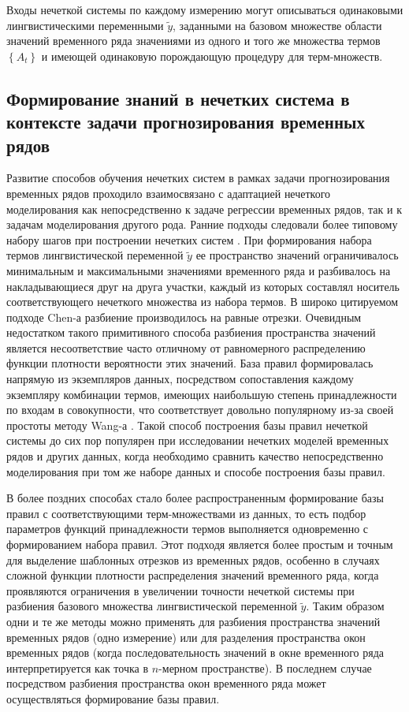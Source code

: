 Входы нечеткой системы по каждому измерению могут описываться одинаковыми лингвистическими переменными $\tilde{y}$, заданными на базовом множестве области значений временного ряда значениями из одного и того же множества термов $\left\{A_t\right\}$ и имеющей одинаковую порождающую процедуру для терм-множеств.

\subsection{Формирование знаний в нечетких система в контексте задачи прогнозирования временных рядов}

Развитие способов обучения нечетких систем в рамках задачи прогнозирования временных рядов проходило взаимосвязано с адаптацией нечеткого моделирования как непосредственно к задаче регрессии временных рядов, так и к задачам моделирования другого рода. Ранние подходы следовали более типовому набору шагов при построении нечетких систем \cite{Chellai2022}. При формирования набора термов лингвистической переменной $\tilde{y}$ ее пространство значений ограничивалось минимальным и максимальными значениями временного ряда и разбивалось на накладывающиеся друг на друга участки, каждый из которых составлял носитель соответствующего нечеткого множества из набора термов. В широко цитируемом подходе Chen-а \cite{Chen1996} разбиение производилось на равные отрезки. Очевидным недостатком такого примитивного способа разбиения пространства значений является несоответствие часто отличному от равномерного распределению функции плотности вероятности этих значений. База правил формировалась напрямую из экземпляров данных, посредством сопоставления каждому экземпляру комбинации термов, имеющих наибольшую степень принадлежности по входам в совокупности, что соответствует довольно популярному из-за своей простоты методу Wang-а \cite{Wang1992}. Такой способ построения базы правил нечеткой системы до сих пор популярен при исследовании нечетких моделей временных рядов и других данных, когда необходимо сравнить качество непосредственно моделирования при том же наборе данных и способе построения базы правил.

В более поздних способах стало более распространенным формирование базы правил с соответствующими терм-множествами из данных, то есть подбор параметров функций принадлежности термов выполняется одновременно с формированием набора правил. Этот подходя является более простым и точным для выделение шаблонных отрезков из временных рядов, особенно в случаях сложной функции плотности распределения значений временного ряда, когда проявляются ограничения в увеличении точности нечеткой системы при разбиения базового множества лингвистической переменной $\tilde{y}$. Таким образом одни и те же методы можно применять для разбиения пространства значений временных рядов (одно измерение) или для разделения пространства окон временных рядов (когда последовательность значений в окне временного ряда интерпретируется как точка в $n$-мерном пространстве). В последнем случае посредством разбиения пространства окон временного ряда может осуществляться формирование базы правил.

